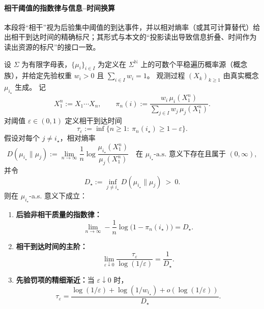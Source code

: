 \paragraph{相干阈值的指数律与信息--时间换算}
本段将“相干”视为后验集中阈值的到达事件，并以相对熵率（或其可计算替代）给出相干到达时间的精确标尺；其形式与本文的“投影读出导致信息折叠、时间作为读出资源的标尺”的接口一致。

\begin{theorem}[相干阈值的贝叶斯到达时间与相对熵率标尺]\label{thm:xi-coherence-arrival-time-relative-entropy-rate}
设 \(\Sigma\) 为有限字母表，\(\{\mu_i\}_{i\in I}\) 为定义在 \(\Sigma^{\mathbb N}\) 上的可数个平稳遍历概率源（概念族），并给定先验权重 \(w_i>0\) 且 \(\sum_{i\in I}w_i=1\)。
观测过程 \((X_k)_{k\ge 1}\) 由真实概念 \(\mu_{i_\star}\) 生成。
记
\[
X_1^n:=X_1\cdots X_n,
\qquad
\pi_n(i):=\frac{w_i\,\mu_i(X_1^n)}{\sum_{j\in I}w_j\,\mu_j(X_1^n)}.
\]
对阈值 \(\varepsilon\in(0,1)\) 定义相干到达时间
\[
\tau_\varepsilon:=\inf\{n\ge 1:\ \pi_n(i_\star)\ge 1-\varepsilon\}.
\]
假设对每个 \(j\neq i_\star\)，相对熵率
\[
D(\mu_{i_\star}\|\mu_j):=\lim_{n\to\infty}\frac1n\log\frac{\mu_{i_\star}(X_1^n)}{\mu_j(X_1^n)}
\quad\text{在 }\mu_{i_\star}\text{-a.s. 意义下存在且属于 }(0,\infty),
\]
并令
\[
D_\star:=\inf_{j\neq i_\star}D(\mu_{i_\star}\|\mu_j)\ >\ 0.
\]
则在 \(\mu_{i_\star}\)-a.s. 意义下成立：
\begin{enumerate}
  \item \textbf{后验非相干质量的指数律：}
  \[
  \lim_{n\to\infty}-\frac1n\log\bigl(1-\pi_n(i_\star)\bigr)=D_\star.
  \]
  \item \textbf{相干到达时间的主阶：}
  \[
  \lim_{\varepsilon\downarrow 0}\frac{\tau_\varepsilon}{\log(1/\varepsilon)}=\frac1{D_\star}.
  \]
  \item \textbf{先验罚项的精细渐近：}当 \(\varepsilon\downarrow 0\) 时，
  \[
  \tau_\varepsilon=\frac{\log(1/\varepsilon)+\log(1/w_{i_\star})+o(\log(1/\varepsilon))}{D_\star}.
  \]
\end{enumerate}
\end{theorem}

